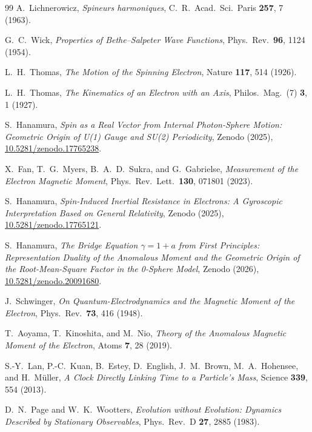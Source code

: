 \documentclass[%
 reprint, amsmath,amssymb, aps, prb, ]{revtex4-2}
\numberwithin{equation}{section}
\begin{document}
\begin{thebibliography}{99}
A.~Lichnerowicz,
\emph{Spineurs harmoniques},
C.~R.~Acad.~Sci.~Paris \textbf{257}, 7 (1963).

G.~C.~Wick,
\emph{Properties of Bethe--Salpeter Wave Functions},
Phys.~Rev.\ \textbf{96}, 1124 (1954).

L.~H.~Thomas,
\emph{The Motion of the Spinning Electron},
Nature \textbf{117}, 514 (1926).

L.~H.~Thomas,
\emph{The Kinematics of an Electron with an Axis},
Philos.~Mag.\ (7) \textbf{3}, 1 (1927).

S.~Hanamura,
\emph{Spin as a Real Vector from Internal Photon-Sphere Motion: Geometric Origin of U(1) Gauge and SU(2) Periodicity},
Zenodo (2025), \href{https://doi.org/10.5281/zenodo.17765238}{10.5281/zenodo.17765238}.

X.~Fan, T.~G.~Myers, B.~A.~D.~Sukra, and G.~Gabrielse,
\emph{Measurement of the Electron Magnetic Moment},
Phys.~Rev.~Lett.\ \textbf{130}, 071801 (2023).

S.~Hanamura,
\emph{Spin-Induced Inertial Resistance in Electrons: A Gyroscopic Interpretation Based on General Relativity},
Zenodo (2025), \href{https://doi.org/10.5281/zenodo.17765121}{10.5281/zenodo.17765121}.

S.~Hanamura,
\emph{The Bridge Equation $\gamma=1+a$ from First Principles: Representation Duality of the Anomalous Moment and the Geometric Origin of the Root-Mean-Square Factor in the 0-Sphere Model},
Zenodo (2026), \href{https://doi.org/10.5281/zenodo.20091680}{10.5281/zenodo.20091680}.

J.~Schwinger,
\emph{On Quantum-Electrodynamics and the Magnetic Moment of the Electron},
Phys.~Rev.\ \textbf{73}, 416 (1948).

T.~Aoyama, T.~Kinoshita, and M.~Nio,
\emph{Theory of the Anomalous Magnetic Moment of the Electron},
Atoms \textbf{7}, 28 (2019).

S.-Y.~Lan, P.-C.~Kuan, B.~Estey, D.~English, J.~M.~Brown, M.~A.~Hohensee, and H.~M\"uller,
\emph{A Clock Directly Linking Time to a Particle's Mass},
Science \textbf{339}, 554 (2013).

D.~N.~Page and W.~K.~Wootters,
\emph{Evolution without Evolution: Dynamics Described by Stationary Observables},
Phys.~Rev.~D \textbf{27}, 2885 (1983).


\end{thebibliography}
\end{document}
